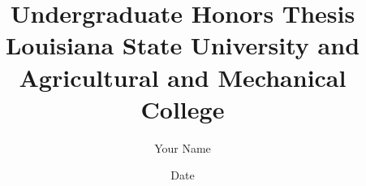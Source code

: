 \documentclass{report}
\begin{document}
    
\title{Undergraduate Honors Thesis\\
{\Large Louisiana State University and Agricultural and Mechanical College}}
\author{Your Name}
\date{Date}
\maketitle





\tableofcontents
\listoffigures







\appendix
    



\end{document}
